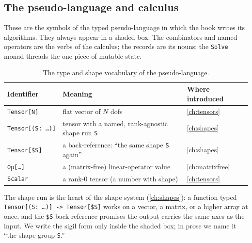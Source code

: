 \subsection{The pseudo-language and calculus}

These are the symbols of the typed pseudo-language in which the book writes its
algorithms. They always appear in a shaded box. The combinators and named
operators are the verbs of the calculus; the records are its nouns; the
\texttt{Solve} monad threads the one piece of mutable state.

\begin{table}[ht]
\centering
\small
\caption[Calculus types and shapes]{The type and shape vocabulary of the
pseudo-language.}
\label{tab:gl-calc-types}
\begin{tabular}{@{}lll@{}}
\toprule
Identifier & Meaning & Where introduced \\
\midrule
\texttt{Tensor[N]} & flat vector of $N$ dofs & \cref{ch:tensors} \\
\texttt{Tensor[(S:\,\dots)]} & tensor with a named, rank-agnostic shape run \texttt{S} & \cref{ch:shapes} \\
\texttt{Tensor[\$S]} & a back-reference: ``the same shape \texttt{S} again'' & \cref{ch:shapes} \\
\texttt{Op[\dots]} & a (matrix-free) linear-operator value & \cref{ch:matrixfree} \\
\texttt{Scalar} & a rank-0 tensor (a number with shape) & \cref{ch:tensors} \\
\bottomrule
\end{tabular}
\end{table}

The shape run is the heart of the shape system (\cref{ch:shapes}): a function
typed \texttt{Tensor[(S:\,\dots)] -> Tensor[\$S]} works on a vector, a matrix, or
a higher array at once, and the \texttt{\$S} back-reference promises the output
carries the same axes as the input. We write the sigil form only inside the
shaded box; in prose we name it ``the shape group \texttt{S}.''

